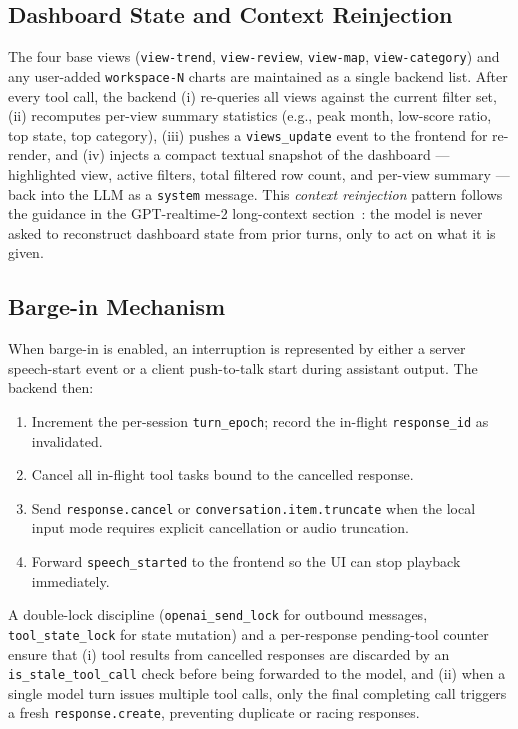 \documentclass[journal]{IEEEtran}
\begin{document}
\subsection{Dashboard State and Context Reinjection}
The four base views (\texttt{view-trend}, \texttt{view-review}, \texttt{view-map}, \texttt{view-category}) and any user-added \texttt{workspace-N} charts are maintained as a single backend list. After every tool call, the backend (i) re-queries all views against the current filter set, (ii) recomputes per-view summary statistics (e.g., peak month, low-score ratio, top state, top category), (iii) pushes a \texttt{views\_update} event to the frontend for re-render, and (iv) injects a compact textual snapshot of the dashboard --- highlighted view, active filters, total filtered row count, and per-view summary --- back into the LLM as a \texttt{system} message. This \emph{context reinjection} pattern follows the guidance in the GPT-realtime-2 long-context section~\cite{openai_realtime_prompt}: the model is never asked to reconstruct dashboard state from prior turns, only to act on what it is given.

\subsection{Barge-in Mechanism}
When barge-in is enabled, an interruption is represented by either a server speech-start event or a client push-to-talk start during assistant output. The backend then:
\begin{enumerate}
\item Increment the per-session \texttt{turn\_epoch}; record the in-flight \texttt{response\_id} as invalidated.
\item Cancel all in-flight tool tasks bound to the cancelled response.
\item Send \texttt{response.cancel} or \texttt{conversation.item.truncate} when the local input mode requires explicit cancellation or audio truncation.
\item Forward \texttt{speech\_started} to the frontend so the UI can stop playback immediately.
\end{enumerate}
A double-lock discipline (\texttt{openai\_send\_lock} for outbound messages, \texttt{tool\_state\_lock} for state mutation) and a per-response pending-tool counter ensure that (i) tool results from cancelled responses are discarded by an \texttt{is\_stale\_tool\_call} check before being forwarded to the model, and (ii) when a single model turn issues multiple tool calls, only the final completing call triggers a fresh \texttt{response.create}, preventing duplicate or racing responses.
\end{document}
